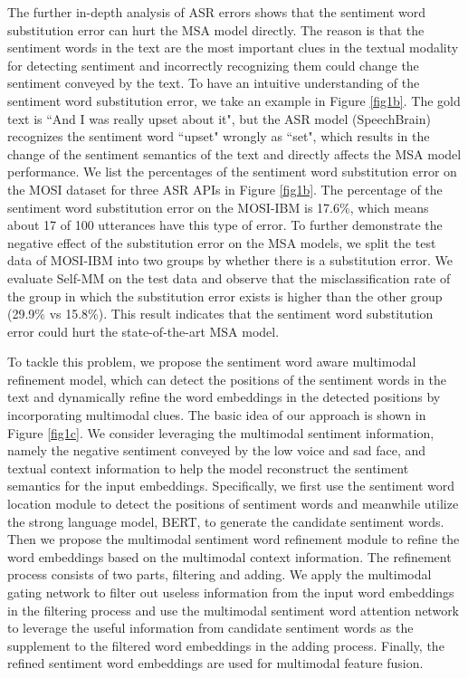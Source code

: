 \documentclass[11pt]{article}
\begin{document}
The further in-depth analysis of ASR errors shows that the sentiment word substitution error can hurt the MSA model directly. The reason is that the sentiment words in the text are the most important clues in the textual modality for detecting sentiment and incorrectly recognizing them could change the sentiment conveyed by the text. To have an intuitive understanding of the sentiment word substitution error, we take an example in Figure \ref{fig1b}. The gold text is ``And I was really upset about it", but the ASR model (SpeechBrain) recognizes the sentiment word ``upset" wrongly as ``set", which results in the change of the sentiment semantics of the text and directly affects the MSA model performance. We list the percentages of the sentiment word substitution error on the MOSI dataset for three ASR APIs in Figure \ref{fig1b}. The percentage of the sentiment word substitution error on the MOSI-IBM is 17.6\%, which means about 17 of 100 utterances have this type of error. To further demonstrate the negative effect of the substitution error on the MSA models, we split the test data of MOSI-IBM into two groups by whether there is a substitution error. We evaluate Self-MM on the test data and observe that the misclassification rate of the group in which the substitution error exists is higher than the other group (29.9\% vs 15.8\%). This result indicates that the sentiment word substitution error could hurt the state-of-the-art MSA model.

To tackle this problem, we propose the sentiment word aware multimodal refinement model, which can detect the positions of the sentiment words in the text and dynamically refine the word embeddings in the detected positions by incorporating multimodal clues. The basic idea of our approach is shown in Figure \ref{fig1c}. We consider leveraging the multimodal sentiment information, namely the negative sentiment conveyed by the low voice and sad face, and textual context information to help the model reconstruct the sentiment semantics for the input embeddings. Specifically, we first use the sentiment word location module to detect the positions of sentiment words and meanwhile utilize the strong language model, BERT, to generate the candidate sentiment words. Then we propose the multimodal sentiment word refinement module to refine the word embeddings based on the multimodal context information. The refinement process consists of two parts, filtering and adding. We apply the multimodal gating network to filter out useless information from the input word embeddings in the filtering process and use the multimodal sentiment word attention network to leverage the useful information from candidate sentiment words as the supplement to the filtered word embeddings in the adding process. Finally, the refined sentiment word embeddings are used for multimodal feature fusion.
\end{document}
